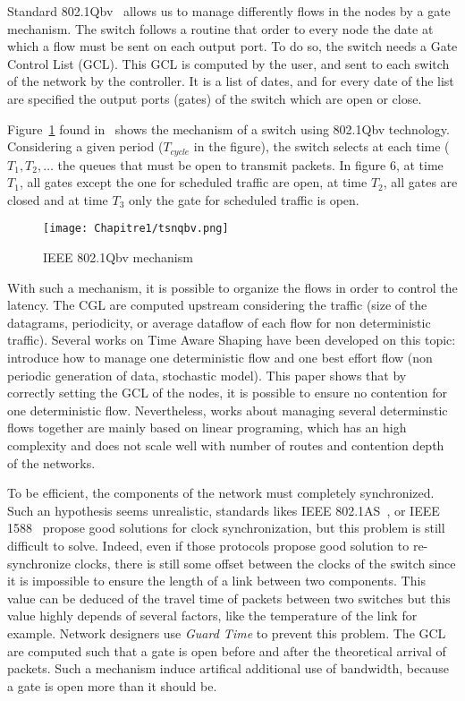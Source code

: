 Standard 802.1Qbv~\cite{8613095} allows us to manage differently flows in the nodes by a gate mechanism. The switch follows a routine that order to every node the date at which a flow must be sent on each output port. To do so, the switch needs a Gate Control List (GCL). This GCL is computed by the user, and sent to each switch of the network by the controller. It is a list of dates, and for every date of the list are specified the output ports (gates) of the switch which are open or close.


Figure~\ref{fig:tsnqbv} found in~\cite{durr2016no} shows the mechanism of a switch using 802.1Qbv technology. Considering a given period ($T_{cycle}$ in the figure), the switch selects at each time ($T_1 , T_2 , \ldots$ the queues that must be open to transmit packets. In figure 6, at time $T_1$, all gates except the one for scheduled traffic are open, at time $T_2$, all gates are closed and at time $T_3$ only the gate for scheduled traffic is open.

  \begin{figure}
  \begin{center}
  \texttt{[image: Chapitre1/tsnqbv.png]}
  \end{center}
  \caption{IEEE 802.1Qbv mechanism}\label{fig:tsnqbv}
  \end{figure}
      
With such a mechanism, it is possible to organize the flows in order to control the latency. The CGL are computed upstream considering the traffic (size of the datagrams, periodicity, or average dataflow of each flow for non deterministic traffic). Several works on Time Aware Shaping have been developed on this topic: \cite{al2017modeling} introduce how to manage one deterministic flow and one best effort flow (non periodic generation of data, stochastic model). This paper shows that by correctly setting the GCL of the nodes, it is possible to ensure no contention for one deterministic flow. Nevertheless, works about managing several determinstic flows together are mainly based on linear programing, which has an high complexity and does not scale well with number of routes and contention depth of the networks. 

To be efficient, the components of the network must completely synchronized. Such an hypothesis seems unrealistic, standards likes IEEE 802.1AS~\cite{5741898}, or IEEE 1588~\cite{4579760} propose good solutions for clock synchronization, but this problem is still difficult to solve. Indeed, even if those protocols propose good solution to re-synchronize clocks, there is still some offset between the clocks of the switch since it is impossible to ensure the length of a link between two components. This value can be deduced of the travel time of packets between two switches but this value highly depends of several factors, like the temperature of the link for example. Network designers use \emph{Guard Time} to prevent this problem. The GCL are computed such that a gate is open before and after the theoretical arrival of packets. Such a mechanism induce artifical additional use of bandwidth, because a gate is open more than it should be.

